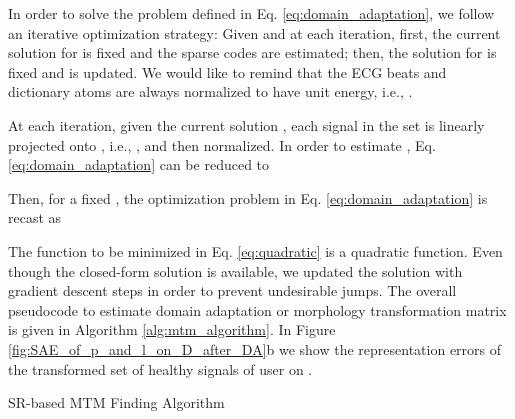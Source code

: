 \documentclass[journal,transmag]{IEEEtran}
\begin{document}
In order to solve the problem defined in Eq. \eqref{eq:domain_adaptation}, we follow an iterative optimization strategy: Given  and  at each iteration, first, the current solution for  is fixed and the sparse codes  are estimated; then, the solution for  is fixed and  is updated. We would like to remind that the ECG beats and dictionary atoms are always normalized to have unit energy, i.e., . 

At each iteration, given the current solution , each signal  in the set  is linearly projected onto , i.e., , and then normalized. In order to estimate , Eq. \eqref{eq:domain_adaptation} can be reduced to

Then, for a fixed , the optimization problem in Eq. \eqref{eq:domain_adaptation} is recast as

The function to be minimized in Eq. \eqref{eq:quadratic} is a quadratic function. Even though the closed-form solution is available, we updated the solution with gradient descent steps in order to prevent undesirable jumps. The overall pseudocode to estimate domain adaptation or morphology transformation
matrix is given in Algorithm \ref{alg:mtm_algorithm}. In Figure \ref{fig:SAE_of_p_and_l_on_D_after_DA}b we show the representation errors of the transformed set of healthy signals of user  on .

\begin{algorithm}
\caption{SR-based MTM Finding Algorithm}
\begin{algorithmic}[1]

    \State 
        \State  {}
        \State  {}




        
\State 
        


\State 
        
        \State 
    \EndFor
    \State \Return 
\EndProcedure

\end{algorithmic}
\label{alg:mtm_algorithm}
\end{algorithm}
\end{document}
